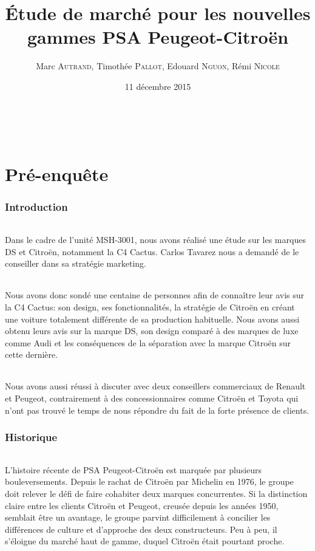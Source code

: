 \documentclass[12pt]{article}\usepackage[]{graphicx}\usepackage[]{color}
\title{Étude de marché pour les nouvelles gammes PSA Peugeot-Citroën}
\author{Marc \textsc{Autrand}, Timothée \textsc{Pallot}, Edouard
	\textsc{Nguon}, Rémi \textsc{Nicole}}
\date{11 décembre 2015}
\begin{document}
\maketitle

\break
~
\newpage
\break
\tableofcontents

\part{Pré-enquête}

\section{Introduction}

\paragraph{} Dans le cadre de l'unité MSH-3001, nous avons réalisé une étude
sur les marques DS et Citroën, notamment la C4 Cactus. Carlos Tavarez nous a
demandé de le conseiller dans sa stratégie marketing.

\paragraph{} Nous avons donc sondé une centaine de personnes afin de connaître
leur avis sur la C4 Cactus: son design, ses fonctionnalités, la stratégie de
Citroën en créant une voiture totalement différente de sa production
habituelle. Nous avons aussi obtenu leurs avis sur la marque DS, son design
comparé à des marques de luxe comme Audi et les conséquences de la séparation
avec la marque Citroën sur cette dernière.

\paragraph{} Nous avons aussi réussi à discuter avec deux conseillers
commerciaux de Renault et Peugeot, contrairement à des concessionnaires comme
Citroën et Toyota qui n'ont pas trouvé le temps de nous
répondre du fait de la forte présence de clients.

\break
\section{Historique}

\paragraph{} L'histoire récente de PSA Peugeot-Citroën est marquée par
plusieurs bouleversements. Depuis le rachat de Citroën par Michelin en 1976, le
groupe doit relever le défi de faire cohabiter deux marques concurrentes. Si la
distinction claire entre les clients Citroën et Peugeot, creusée depuis les
années 1950, semblait être un avantage, le groupe parvint difficilement à
concilier les différences de culture et d'approche des deux constructeurs. Peu
à peu, il s'éloigne du marché haut de gamme, duquel Citroën était pourtant
proche.
\end{document}
